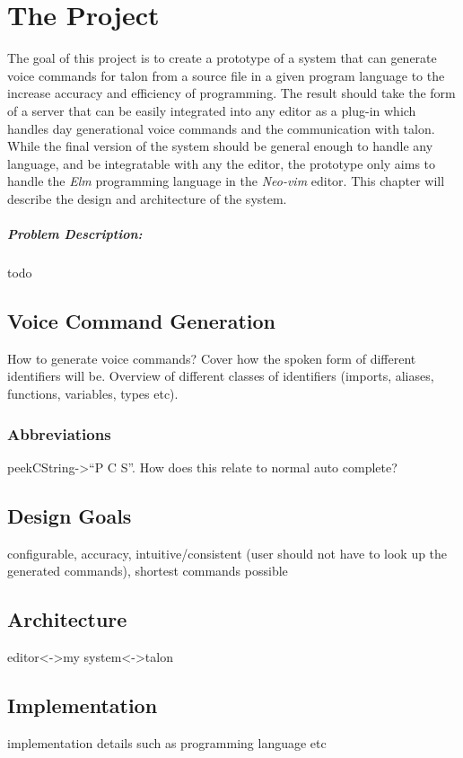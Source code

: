\documentclass[../thesis.tex]{subfiles}
\begin{document}
\chapter{The Project}\label{the_project}
The goal of this project is to create a prototype of a system that can generate voice commands
for talon from a source file in a given program language to the increase accuracy and efficiency of programming.
The result should take the form of a server that can be easily integrated into any editor as a plug-in
which handles day generational voice commands and the communication with talon.
While the final version of the system should be general enough to handle any language, and be integratable with any the editor,
the prototype only aims to handle the \textit{Elm} programming language in the \textit{Neo-vim} editor.
This chapter will describe the design and architecture of the system.

\paragraph{Problem Description:}%
todo

\section{Voice Command Generation}%
\label{sec:voice_command_generation}
How to generate voice commands?
Cover how the spoken form of different identifiers will be.
Overview of different classes of identifiers (imports, aliases, functions, variables, types etc).
\subsection{Abbreviations}
peekCString->``P C S''. How does this relate to normal auto complete?


\section{Design Goals}%
\label{sec:design_goals}
configurable, accuracy, intuitive/consistent (user should not have to look up the generated commands), 
shortest commands possible

\section{Architecture}%
\label{sec:architecture}
editor<->my system<->talon

\section{Implementation}%
\label{sec:implementation}
implementation details such as programming language etc
\end{document}
